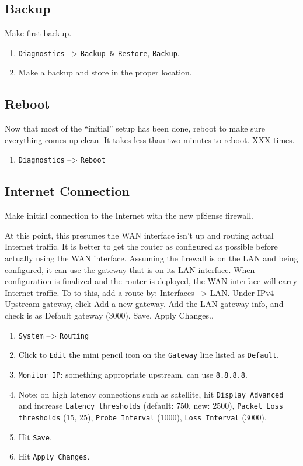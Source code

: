 \subsection{Backup}
Make first backup.

\begin{enumerate}
 \item \texttt{Diagnostics} --> \texttt{Backup \& Restore}, \texttt{Backup}.
 \item Make a backup and store in the proper location.
\end{enumerate}

\subsection{Reboot}
Now that most of the ``initial'' setup has been done, reboot to make sure everything comes up clean.
It takes less than two minutes to reboot. XXX times.

\begin{enumerate}
 \item \texttt{Diagnostics} --> \texttt{Reboot}
\end{enumerate}

\subsection{Internet Connection}
Make initial connection to the Internet with the new pfSense firewall.


At this point, this presumes the WAN interface isn't up and routing actual Internet traffic. It is better to get the router as configured as possible before actually using the WAN interface. Assuming the firewall is on the LAN and being configured, it can use the gateway that is on its LAN interface. When configuration is finalized and the router is deployed, the WAN interface will carry Internet traffic. To to this, add a route by: Interfaces --> LAN. Under IPv4 Upstream gateway, click Add a new gateway. Add the LAN gateway info, and check is as Default gateway (3000). Save. Apply Changes..

\begin{enumerate}
 \item \texttt{System} --> \texttt{Routing}
 \item Click to \texttt{Edit} the mini pencil icon on the \texttt{Gateway} line listed as \texttt{Default}.
 \item \texttt{Monitor IP}: something appropriate upstream, can use \texttt{8.8.8.8}.
 \item Note: on high latency connections such as satellite, hit \texttt{Display Advanced} and increase \texttt{Latency thresholds} (default: 750, new: 2500), \texttt{Packet Loss thresholds} (15, 25), \texttt{Probe Interval} (1000), \texttt{Loss Interval} (3000).
 \item Hit \texttt{Save}.
 \item Hit \texttt{Apply Changes}.
\end{enumerate}


